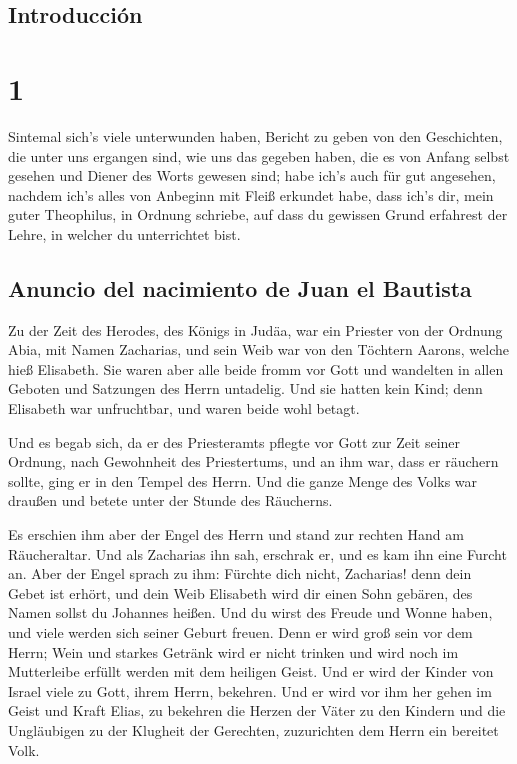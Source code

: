 \hypertarget{introducciuxf3n}{%
\subsection{Introducción}\label{introducciuxf3n}}

\hypertarget{section}{%
\section{1}\label{section}}

 Sintemal sich's viele unterwunden haben, Bericht zu geben
von den Geschichten, die unter uns ergangen sind,  wie uns
das gegeben haben, die es von Anfang selbst gesehen und Diener des Worts
gewesen sind;  habe ich's auch für gut angesehen, nachdem
ich's alles von Anbeginn mit Fleiß erkundet habe, dass ich's dir, mein
guter Theophilus, in Ordnung schriebe,  auf dass du
gewissen Grund erfahrest der Lehre, in welcher du unterrichtet bist.

\hypertarget{anuncio-del-nacimiento-de-juan-el-bautista}{%
\subsection{Anuncio del nacimiento de Juan el
Bautista}\label{anuncio-del-nacimiento-de-juan-el-bautista}}

 Zu der Zeit des Herodes, des Königs in Judäa, war ein
Priester von der Ordnung Abia, mit Namen Zacharias, und sein Weib war
von den Töchtern Aarons, welche hieß Elisabeth.  Sie waren
aber alle beide fromm vor Gott und wandelten in allen Geboten und
Satzungen des Herrn untadelig.  Und sie hatten kein Kind;
denn Elisabeth war unfruchtbar, und waren beide wohl betagt.

 Und es begab sich, da er des Priesteramts pflegte vor
Gott zur Zeit seiner Ordnung,  nach Gewohnheit des
Priestertums, und an ihm war, dass er räuchern sollte, ging er in den
Tempel des Herrn.  Und die ganze Menge des Volks war
draußen und betete unter der Stunde des Räucherns.

 Es erschien ihm aber der Engel des Herrn und stand zur
rechten Hand am Räucheraltar.  Und als Zacharias ihn sah,
erschrak er, und es kam ihn eine Furcht an.  Aber der
Engel sprach zu ihm: Fürchte dich nicht, Zacharias! denn dein Gebet ist
erhört, und dein Weib Elisabeth wird dir einen Sohn gebären, des Namen
sollst du Johannes heißen.  Und du wirst des Freude und
Wonne haben, und viele werden sich seiner Geburt freuen. 
Denn er wird groß sein vor dem Herrn; Wein und starkes Getränk wird er
nicht trinken und wird noch im Mutterleibe erfüllt werden mit dem
heiligen Geist.  Und er wird der Kinder von Israel viele
zu Gott, ihrem Herrn, bekehren.  Und er wird vor ihm her
gehen im Geist und Kraft Elias, zu bekehren die Herzen der Väter zu den
Kindern und die Ungläubigen zu der Klugheit der Gerechten, zuzurichten
dem Herrn ein bereitet Volk.

